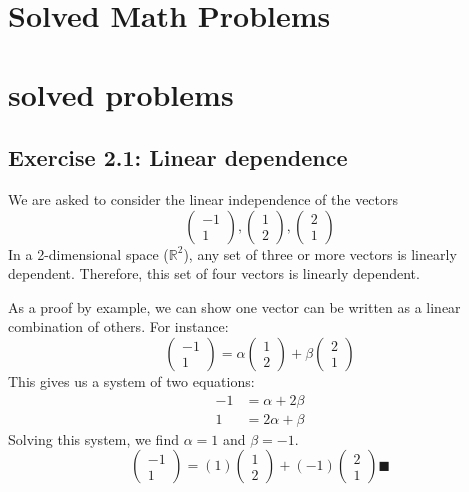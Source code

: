 \documentclass{article}
\begin{document}
\section*{Solved Math Problems}

\section{solved problems}
\subsection*{Exercise 2.1: Linear dependence}
We are asked to consider the linear independence of the vectors
$$ \begin{pmatrix} -1 \\ 1 \end{pmatrix}, \begin{pmatrix} 1 \\ 2 \end{pmatrix}, \begin{pmatrix} 2 \\ 1 \end{pmatrix} $$
In a 2-dimensional space ($\mathbb{R}^2$), any set of three or more vectors is linearly dependent. Therefore, this set of four vectors is linearly dependent.

As a proof by example, we can show one vector can be written as a linear combination of others. For instance:
$$ \begin{pmatrix} -1 \\ 1 \end{pmatrix} = \alpha \begin{pmatrix} 1 \\ 2 \end{pmatrix} + \beta \begin{pmatrix} 2 \\ 1 \end{pmatrix} $$
This gives us a system of two equations:
\begin{align*} -1 &= \alpha + 2\beta \\ 1 &= 2\alpha + \beta \end{align*}
Solving this system, we find $\alpha = 1$ and $\beta = -1$.
$$ \begin{pmatrix} -1 \\ 1 \end{pmatrix} = (1) \begin{pmatrix} 1 \\ 2 \end{pmatrix} + (-1) \begin{pmatrix} 2 \\ 1 \end{pmatrix} 
\blacksquare$$
\end{document}
